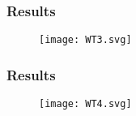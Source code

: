 \begin{frame}\frametitle{Results}

\begin{figure}
\centering
\texttt{[image: WT3.svg]}
\caption{}
\label{}
\end{figure}

\end{frame}

\begin{frame}\frametitle{Results}

\begin{figure}
\centering
\texttt{[image: WT4.svg]}
\caption{}
\label{}
\end{figure}

\end{frame}

\endinput